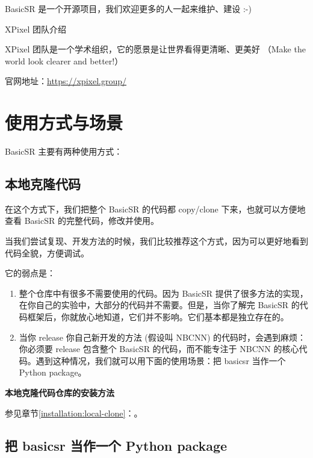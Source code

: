 \documentclass[../main.tex]{subfiles}
\begin{document}
BasicSR 是一个开源项目，我们欢迎更多的人一起来维护、建设 :-)

\begin{exampleBox}[]{XPixel 团队介绍}

XPixel 团队是一个学术组织，它的愿景是让世界看得更清晰、更美好 （Make the world look clearer and better!）

    官网地址：\url{https://xpixel.group/}
\end{exampleBox}

\section{使用方式与场景}
\label{overview:scenario}
BasicSR 主要有两种使用方式：

\subsection{本地克隆代码}

在这个方式下，我们把整个 BasicSR 的代码都 copy/clone 下来，也就可以方便地查看 BasicSR 的完整代码，修改并使用。

当我们尝试复现、开发方法的时候，我们比较推荐这个方式，因为可以更好地看到代码全貌，方便调试。

它的弱点是：

\begin{enumerate}
    \item 整个仓库中有很多不需要使用的代码。因为 BasicSR 提供了很多方法的实现，在你自己的实验中，大部分的代码并不需要。但是，当你了解完 BasicSR 的代码框架后，你就放心地知道，它们并不影响。它们基本都是独立存在的。
    \item 当你 release 你自己新开发的方法 (假设叫 NBCNN) 的代码时，会遇到麻烦：你必须要 release 包含整个 BasicSR 的代码，而不能专注于 NBCNN 的核心代码。遇到这种情况，我们就可以用下面的使用场景：把 basicsr 当作一个 Python package。
\end{enumerate}

\begin{note} %
    \textbf{本地克隆代码仓库的安装方法}

    参见章节\ref{installation:local-clone}：。
\end{note}

\subsection{把 basicsr 当作一个 Python package}
\end{document}
